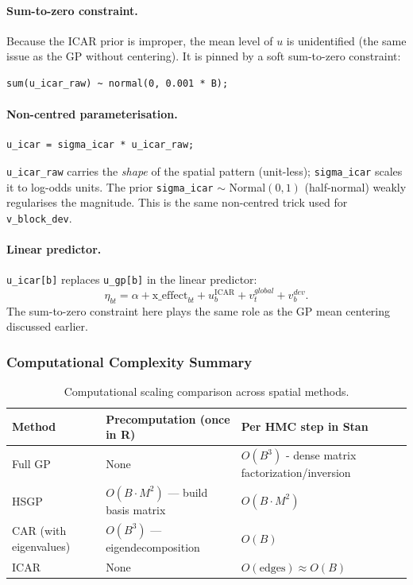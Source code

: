 \documentclass[12pt,a4paper]{article}
\begin{document}
\paragraph{Sum-to-zero constraint.}
Because the ICAR prior is improper, the mean level of $u$ is unidentified (the same issue as the GP without centering). It is pinned by a soft sum-to-zero constraint:
\begin{verbatim}
sum(u_icar_raw) ~ normal(0, 0.001 * B);
\end{verbatim}

\paragraph{Non-centred parameterisation.}
\begin{verbatim}
u_icar = sigma_icar * u_icar_raw;
\end{verbatim}
\texttt{u\_icar\_raw} carries the \emph{shape} of the spatial pattern (unit-less); \texttt{sigma\_icar} scales it to log-odds units. The prior \texttt{sigma\_icar} $\sim$ Normal$(0, 1)$ (half-normal) weakly regularises the magnitude. This is the same non-centred trick used for \texttt{v\_block\_dev}.

\paragraph{Linear predictor.}
\texttt{u\_icar[b]} replaces \texttt{u\_gp[b]} in the linear predictor:
$$\eta_{bt} = \alpha + \text{x\_effect}_{bt} + u^{\text{ICAR}}_b + v_t^{global} + v_b^{dev}.$$
The sum-to-zero constraint here plays the same role as the GP mean centering discussed earlier.

\subsubsection{Computational Complexity Summary}

\begin{table}[h]
\centering
\small
\begin{tabular}{lll}
\toprule
\textbf{Method} & \textbf{Precomputation (once in R)} & \textbf{Per HMC step in Stan} \\
\midrule
Full GP & None & $O(B^3)$ - dense matrix factorization/inversion \\
HSGP & $O(B\cdot M^2)$ --- build basis matrix  & $O(B\cdot M^2)$ \\
CAR (with eigenvalues) & $O(B^3)$ --- eigendecomposition & $O(B)$ \\
ICAR & None & $O(\text{edges}) \approx O(B)$ \\
\bottomrule
\end{tabular}
\caption{Computational scaling comparison across spatial methods.}
\label{tab:complexity_summary}
\end{table}
\end{document}
